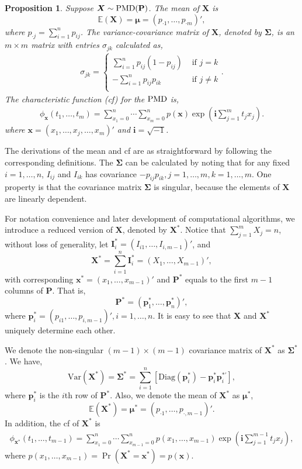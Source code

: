 \documentclass[12pt]{article}
\newcommand{\Sigmavec}{{\boldsymbol{\Sigma}}}
\newcommand{\Ivec}{{\boldsymbol{I}}}
\newcommand{\EE}{\mathbb{E}}
\newcommand{\Pmat}{\mathbf{P}}
\newcommand{\pvec}{\boldsymbol{p}}
\newcommand{\Var}{{\textrm{Var}}}
\newcommand{\ivec}{{\boldsymbol{i}}}
\newcommand{\diag}{\textrm{Diag}}
\newcommand{\PMD}{{\normalfont\textrm{PMD}}}
\newcommand{\Xvec}{\boldsymbol{X}}
\newcommand{\xvec}{\boldsymbol{x}}
\newcommand{\muvec}{\boldsymbol{\mu}}
\newcommand{\Sig}{\boldsymbol{\Sigma}}
\newtheorem{ppt}{Proposition}
\begin{document}
\begin{ppt}%
Suppose $\Xvec \sim \PMD (\Pmat)$. The mean of $\Xvec$ is
$$\EE(\Xvec) = \muvec = \left( p_{\cdot1} ,\dots,p_{\cdot m}\right)',$$ 
where $p_{\cdot j} = \sum_{i=1}^{n}p_{ij}$.
The variance-covariance matrix of $\Xvec$, denoted by $\Sig$, is an $m \times m$ matrix with entries $\sigma_{jk}$ calculated as,
\begin{align*}
   \sigma_{jk} =
           \begin{cases}
             \sum_{i=1}^{n}p_{ij}(1-p_{ij}) & \text{ if } j=k\\
             -\sum_{i=1}^{n}p_{ij}p_{ik} &  \text{ if } j \neq k\\
           \end{cases}.
\end{align*}
The characteristic function (cf) for the $\PMD$ is,
\begin{align*}
\phi_{\xvec}(t_1, \dots, t_{m})  =  \sum_{x_1 = 0}^{n} \cdots \sum_{x_{m} = 0}^n p(\xvec)\exp\left(\ivec\sum_{j=1}^{m}t_jx_j\right).
\end{align*}
where $\xvec=(x_1, \dots, x_j, \dots, x_m)'$ and $\ivec=\sqrt{-1}$.
\end{ppt}

The derivations of the mean and cf are as straightforward by following the corresponding definitions. The $\Sig$ can be calculated by noting that for any fixed $i=1,\dots,n$, $I_{ij}$ and $I_{ik}$ has covariance $-p_{ij}p_{ik},j=1,\dots,m,k=1,\dots,m$. One property is that the covariance matrix $\Sig$ is singular, because the elements of $\Xvec$ are linearly dependent.

For notation convenience and later development of computational algorithms, we introduce a reduced version of $\Xvec$, denoted by $\Xvec^{\ast}$. Notice that $\sum_{j=1}^{m}X_j = n$, without loss of generality, let $\Ivec_i^{\ast} = (I_{i1},\dots,I_{i,m-1})'$, and
$$\Xvec^{\ast}=\sum_{i=1}^{n}\Ivec_{i}^{\ast}=(X_1,\dots,X_{m-1})',$$
with corresponding $\xvec^{\ast} = (x_1,\dots,x_{m-1})'$ and $\Pmat^{\ast}$ equals to the first $m-1$ columns of $\Pmat$. That is,
$$
\Pmat^{\ast} = \left(\pvec_1^{\ast},\dots, \pvec_n^{\ast} \right)',
$$
where $\pvec_{i}^{\ast} = \left(p_{i1},\dots,p_{i,m-1} \right)', i = 1,\dots,n$. It is easy to see that $\Xvec$ and $\Xvec^{\ast}$ uniquely determine each other.

We denote the non-singular $(m-1) \times (m-1)$ covariance matrix of $\Xvec^{\ast}$ as $\Sigmavec^{\ast}$. We have,
$$\Var(\Xvec^{\ast}) =\Sig^{\ast}=\sum_{i=1}^n[\diag(\pvec_i^{\ast})-\pvec_i^{\ast} \pvec_i^{\ast \prime}],$$
where $\pvec_i^{\ast}$ is the $i$th row of $\Pmat^{\ast}$. Also, we denote the mean of $\Xvec^{\ast}$ as $\muvec^{\ast}$,
$$\EE(\Xvec^{\ast}) =\muvec^{\ast} = \left( p_{\cdot1} ,\dots,p_{\cdot,m-1}\right)'.$$
In addition, the cf of $\Xvec^{\ast}$ is
\begin{align*}
\phi_{\xvec^{\ast}}(t_1, \dots, t_{m-1})  =  \sum_{x_1 = 0}^{n} \cdots \sum_{x_{m-1} = 0}^n p(x_1,\ldots,x_{m-1})\exp\left(\ivec\sum_{j=1}^{m-1}t_jx_j\right),
\end{align*}
where $p(x_1,\ldots,x_{m-1})=\Pr(\Xvec^{\ast}=\xvec^{\ast})=p(\xvec)$.
\end{document}
